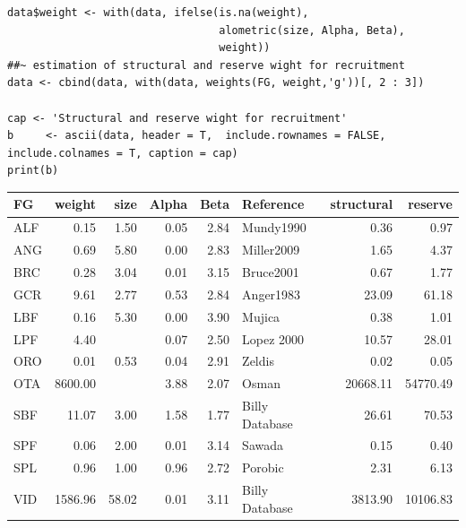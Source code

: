 \documentclass[11pt]{article}
\begin{document}
\begin{itemize}
\begin{itemize}
\begin{verbatim}
data$weight <- with(data, ifelse(is.na(weight),
                                 alometric(size, Alpha, Beta),
                                 weight))
##~ estimation of structural and reserve wight for recruitment
data <- cbind(data, with(data, weights(FG, weight,'g'))[, 2 : 3])

cap <- 'Structural and reserve wight for recruitment'
b     <- ascii(data, header = T,  include.rownames = FALSE, include.colnames = T, caption = cap)
print(b)
\end{verbatim}

\begin{center}
\begin{tabular}{lrrrrlrr}
 FG   &   weight  &   size  &  Alpha  &  Beta  &  Reference       &  structural  &   reserve  \\
\hline
 ALF  &     0.15  &   1.50  &   0.05  &  2.84  &  Mundy1990       &        0.36  &      0.97  \\
 ANG  &     0.69  &   5.80  &   0.00  &  2.83  &  Miller2009      &        1.65  &      4.37  \\
 BRC  &     0.28  &   3.04  &   0.01  &  3.15  &  Bruce2001       &        0.67  &      1.77  \\
 GCR  &     9.61  &   2.77  &   0.53  &  2.84  &  Anger1983       &       23.09  &     61.18  \\
 LBF  &     0.16  &   5.30  &   0.00  &  3.90  &  Mujica          &        0.38  &      1.01  \\
 LPF  &     4.40  &         &   0.07  &  2.50  &  Lopez 2000      &       10.57  &     28.01  \\
 ORO  &     0.01  &   0.53  &   0.04  &  2.91  &  Zeldis          &        0.02  &      0.05  \\
 OTA  &  8600.00  &         &   3.88  &  2.07  &  Osman           &    20668.11  &  54770.49  \\
 SBF  &    11.07  &   3.00  &   1.58  &  1.77  &  Billy Database  &       26.61  &     70.53  \\
 SPF  &     0.06  &   2.00  &   0.01  &  3.14  &  Sawada          &        0.15  &      0.40  \\
 SPL  &     0.96  &   1.00  &   0.96  &  2.72  &  Porobic         &        2.31  &      6.13  \\
 VID  &  1586.96  &  58.02  &   0.01  &  3.11  &  Billy Database  &     3813.90  &  10106.83  \\
\end{tabular}
\end{center}


\end{itemize} %
\end{itemize} %
\end{document}
